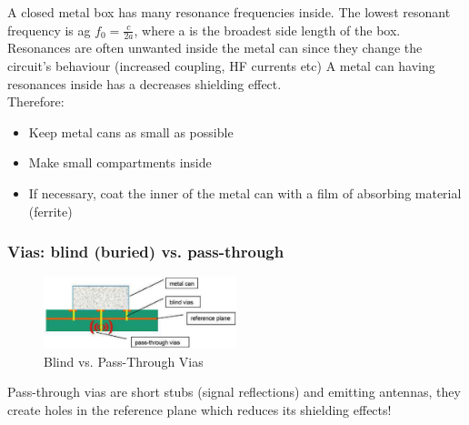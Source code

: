 		A closed metal box has many resonance frequencies inside. The lowest resonant frequency is ag $f_0 = \frac{c}{2a}$, where a is the broadest side length of the box. Resonances are often unwanted inside the metal can since they change the circuit's behaviour (increased coupling, HF currents etc) A metal can having resonances inside has a decreases shielding effect.\\
		Therefore: 
		\begin{itemize}
			\item Keep metal cans as small as possible
			\item Make small compartments inside
			\item If necessary, coat the inner of the metal can with a film of absorbing material (ferrite)
		\end{itemize} 
		\subsubsection{Vias: blind (buried) vs. pass-through}
			\begin{figure}[h!]
				\centering
				\includegraphics[width=0.5\textwidth]{images/Vias.png}
				\caption{Blind vs. Pass-Through Vias}
				\label{Fig:BlindvsPassthroughVias}
			\end{figure}
			Pass-through vias are short stubs (signal reflections) and emitting antennas, they create holes in the reference plane which reduces its shielding effects!
